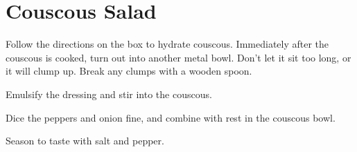 \section{Couscous Salad}
\begin{recipe}



Follow the directions on the box to hydrate couscous.
Immediately after the couscous is cooked, turn out into another metal bowl. Don't let it
sit too long, or it will clump up. Break any clumps with a wooden spoon.


Emulsify the dressing and stir into the couscous.


Dice the peppers and onion fine, and combine with rest in the couscous bowl.

Season to taste with salt and pepper.

\end{recipe}
